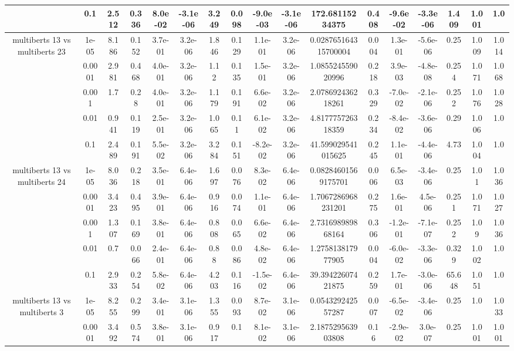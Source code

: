 \begin{tabular}{|c|c|c|c|c|c|c|c|c|c|c|c|c|c|c|c|c|}
 & 0.1 & 2.512 & 0.336 & 8.0e-02 & -3.1e-06 & 3.249 & 0.098 & -9.0e-03 & -3.1e-06 & 172.68115234375 & 0.408 & -9.6e-02 & -3.3e-06 & 1.409 & 1.001 & 1.0 \\
\hline
\multirow{5}{*}{multiberts 13 vs multiberts 23} & 1e-05 & 8.186 & 0.152 & 3.7e-01 & 3.2e-06 & 1.846 & 0.129 & 1.1e-01 & 3.2e-06 & 0.028765164315700004 & 0.004 & 1.3e-01 & -5.6e-06 & 0.25 & 1.009 & 1.014 \\
 & 0.0001 & 2.981 & 0.468 & 4.0e-01 & 3.2e-06 & 1.12 & 0.135 & 1.5e-01 & 3.2e-06 & 1.085524559020996 & 0.218 & 3.9e-03 & -4.8e-08 & 0.254 & 1.071 & 1.068 \\
 & 0.001 & 1.7 & 0.28 & 4.0e-01 & 3.2e-06 & 1.179 & 0.191 & 6.6e-02 & 3.2e-06 & 2.078692436218261 & 0.329 & -7.0e-02 & -2.1e-06 & 0.252 & 1.076 & 1.028 \\
 & 0.01 & 0.941 & 0.119 & 2.5e-01 & 3.2e-06 & 1.065 & 0.11 & 6.1e-02 & 3.2e-06 & 4.817775726318359 & 0.234 & -8.4e-02 & -3.6e-06 & 0.29 & 1.006 & 1.0 \\
 & 0.1 & 2.489 & 0.191 & 5.5e-02 & 3.2e-06 & 3.284 & 0.151 & -8.2e-02 & 3.2e-06 & 41.599029541015625 & 0.245 & 1.1e-01 & -4.4e-06 & 4.73 & 1.004 & 1.0 \\
\hline
\multirow{5}{*}{multiberts 13 vs multiberts 24} & 1e-05 & 8.036 & 0.218 & 3.5e-01 & 6.4e-06 & 1.697 & 0.076 & 8.3e-02 & 6.4e-06 & 0.08284601569175701 & 0.006 & 6.5e-03 & -3.4e-06 & 0.25 & 1.01 & 1.036 \\
 & 0.0001 & 3.423 & 0.495 & 3.9e-01 & 6.4e-06 & 0.916 & 0.074 & 1.1e-01 & 6.4e-06 & 1.7067286968231201 & 0.275 & 1.6e-01 & 4.5e-06 & 0.251 & 1.071 & 1.027 \\
 & 0.001 & 1.307 & 0.169 & 3.8e-01 & 6.4e-06 & 0.808 & 0.065 & 6.6e-02 & 6.4e-06 & 2.731698989868164 & 0.306 & -1.2e-01 & -7.1e-07 & 0.252 & 1.09 & 1.036 \\
 & 0.01 & 0.7 & 0.066 & 2.4e-01 & 6.4e-06 & 0.88 & 0.086 & 4.8e-02 & 6.4e-06 & 1.275813817977905 & 0.004 & -6.0e-02 & -3.3e-06 & 0.329 & 1.002 & 1.0 \\
 & 0.1 & 2.933 & 0.254 & 5.8e-02 & 6.4e-06 & 4.203 & 0.116 & -1.5e-02 & 6.4e-06 & 39.39422607421875 & 0.259 & 1.7e-01 & -3.0e-06 & 65.648 & 1.051 & 1.0 \\
\hline
\multirow{5}{*}{multiberts 13 vs multiberts 3} & 1e-05 & 8.255 & 0.299 & 3.4e-01 & 3.1e-06 & 1.355 & 0.093 & 8.7e-02 & 3.1e-06 & 0.054329242557287 & 0.007 & -6.5e-02 & -3.4e-06 & 0.25 & 1.0 & 1.033 \\
 & 0.0001 & 3.492 & 0.574 & 3.8e-01 & 3.1e-06 & 0.917 & 0.1 & 8.1e-02 & 3.1e-06 & 2.187529563903808 & 0.16 & -2.9e-02 & 3.0e-07 & 0.25 & 1.001 & 1.001 \\

\end{tabular}
